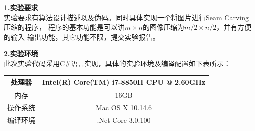 \documentclass[a4paper]{article}
\begin{document}
\courseheader
{}

\info

\begin{enumerate}
  \setlength{\itemsep}{3\parskip}
  \textbf{1.实验要求}\\
  实验要求有算法设计描述以及伪码。同时具体实现一个将图片进行Seam Carving压缩的程序，
  程序的基本功能是可以讲$m\times n$的图像压缩为$m/2 \times n/2$，并有方便的输入
  输出功能，其它功能不限，提交实验报告。\\
  \bigskip

  \textbf{2.实验环境}\\
  此次实验代码采用C\#语言实现，具体的实验环境及编译配置如下表所示：\\ \medskip
  \begin{tabular}{c|c}
    \hline\hline
    处理器 & Intel(R) Core(TM) i7-8850H CPU @ 2.60GHz \\ \hline
    内存 & 16GB\\ \hline
    操作系统& Mac OS X 10.14.6\\ \hline
    编译环境& .Net Core 3.0.100\\
    \hline\hline
  \end{tabular}\\
  \bigskip


\end{enumerate}
\end{document}
